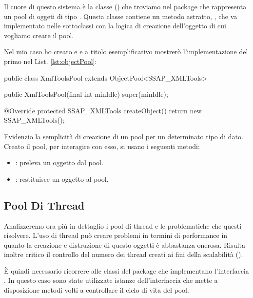 Il cuore di questo sistema è la classe  (\cite{objectpool}) che troviamo nel package  che rappresenta un pool di oggeti di tipo . Questa classe contiene un metodo astratto, , che va implementato nelle sottoclassi con la logica di creazione dell'oggetto di cui vogliamo creare il pool.

Nel mio caso ho creato  e  e a titolo esemplificativo mostrerò l'implementazione del primo nel List. \ref{lst:objectPool}:

\begin{java}[caption={Implementazione di ObjectPool},label={lst:objectPool}]
public class XmlToolsPool extends ObjectPool<SSAP_XMLTools>{
	
	public XmlToolsPool(final int minIdle) {
		super(minIdle);
	}

	@Override
	protected SSAP_XMLTools createObject() {
		return new SSAP_XMLTools();
	}
}
\end{java}

\noindent
Evidenzio la semplicità di creazione di un pool per un determinato tipo di dato. Creato il pool, per interagire con esso, si usano i seguenti metodi:

\begin{itemize}
	\item {}: preleva un oggetto dal pool.
	\item {}: restituisce un oggetto al pool.
\end{itemize}

\subsection{Pool Di Thread}

Analizzeremo ora più in dettaglio i pool di thread e le problematiche che questi risolvere.
L'uso di thread può creare problemi in termini di performance in quanto la creazione e distruzione di questo oggetti è abbastanza onerosa. Risulta inoltre critico il controllo del numero dei thread creati ai fini della scalabilità (\cite{vetti2008}).

È quindi necessario ricorrere alle classi del package  che implementano l'interfaccia . In questo caso sono state utilizzate istanze dell'interfaccia  che mette a disposizione metodi volti a controllare il ciclo di vita del pool.

